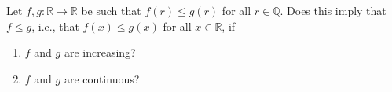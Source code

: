 \begin{problem}
    Let \( f, g \colon \mathbb{R} \rightarrow \mathbb{R} \) be such that \( f\left(r\right) \leq g\left(r\right) \) for all \( r \in \mathbb{Q} \). Does this imply that \( f \leq g \), i.e., that \( f\left(x\right) \leq g\left(x\right) \) for all \( x \in \mathbb{R} \), if
    \begin{enumerate}
        \item[(a)] \( f \) and \( g \) are increasing?
        \item[(b)] \( f \) and \( g \) are continuous?
    \end{enumerate}
\end{problem}
